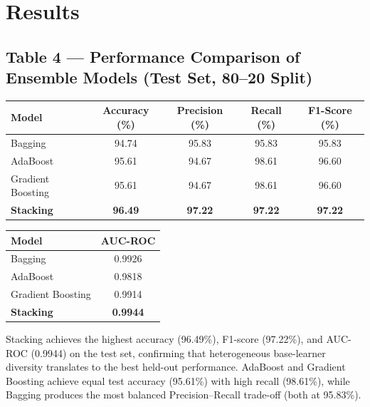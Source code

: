 \documentclass[12pt,a4paper]{article}
\begin{document}
\section{Results}

\subsection*{Table 4 — Performance Comparison of Ensemble Models (Test Set, 80--20 Split)}

\begin{center}
\begin{tabular}{lcccc}
\toprule
\textbf{Model}        & \textbf{Accuracy (\%)} & \textbf{Precision (\%)}
  & \textbf{Recall (\%)} & \textbf{F1-Score (\%)} \\
\midrule
Bagging           & 94.74 & 95.83 & 95.83 & 95.83 \\
AdaBoost          & 95.61 & 94.67 & 98.61 & 96.60 \\
Gradient Boosting & 95.61 & 94.67 & 98.61 & 96.60 \\
\textbf{Stacking} & \textbf{96.49} & \textbf{97.22} & \textbf{97.22} & \textbf{97.22} \\
\bottomrule
\end{tabular}
\end{center}

\begin{center}
\begin{tabular}{lc}
\toprule
\textbf{Model}        & \textbf{AUC-ROC} \\
\midrule
Bagging           & 0.9926 \\
AdaBoost          & 0.9818 \\
Gradient Boosting & 0.9914 \\
\textbf{Stacking} & \textbf{0.9944} \\
\bottomrule
\end{tabular}
\end{center}

Stacking achieves the highest accuracy (96.49\%), F1-score (97.22\%), and AUC-ROC (0.9944) on the
test set, confirming that heterogeneous base-learner diversity translates to the best held-out
performance. AdaBoost and Gradient Boosting achieve equal test accuracy (95.61\%) with high recall
(98.61\%), while Bagging produces the most balanced Precision--Recall trade-off (both at 95.83\%).
\end{document}

